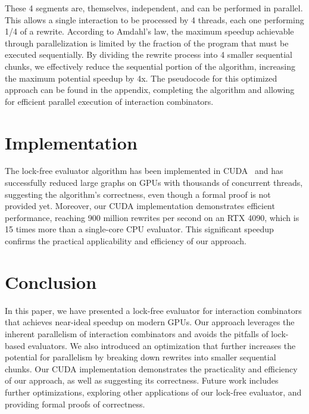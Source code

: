 \documentclass{article}
\begin{document}
These 4 segments are, themselves, independent, and can be performed in parallel. This allows a single interaction to be processed by 4 threads, each one performing 1/4 of a rewrite. According to Amdahl's law, the maximum speedup achievable through parallelization is limited by the fraction of the program that must be executed sequentially. By dividing the rewrite process into 4 smaller sequential chunks, we effectively reduce the sequential portion of the algorithm, increasing the maximum potential speedup by 4x. The pseudocode for this optimized approach can be found in the appendix, completing the algorithm and allowing for efficient parallel execution of interaction combinators.

\section{Implementation}\label{s:implementation}

The lock-free evaluator algorithm has been implemented in CUDA~\cite{taelin2022lock} and has successfully reduced large graphs on GPUs with thousands of concurrent threads, suggesting the algorithm's correctness, even though a formal proof is not provided yet. Moreover, our CUDA implementation demonstrates efficient performance, reaching 900 million rewrites per second on an RTX 4090, which is 15 times more than a single-core CPU evaluator. This significant speedup confirms the practical applicability and efficiency of our approach.

\section{Conclusion}\label{s:conclusion}

In this paper, we have presented a lock-free evaluator for interaction combinators that achieves near-ideal speedup on modern GPUs. Our approach leverages the inherent parallelism of interaction combinators and avoids the pitfalls of lock-based evaluators. We also introduced an optimization that further increases the potential for parallelism by breaking down rewrites into smaller sequential chunks. Our CUDA implementation demonstrates the practicality and efficiency of our approach, as well as suggesting its correctness. Future work includes further optimizations, exploring other applications of our lock-free evaluator, and providing formal proofs of correctness.
\end{document}
